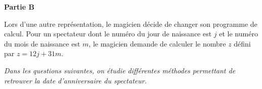 \documentclass[10pt]{article}
\begin{document}
\textbf{Partie B}

\medskip
 
Lors d'une autre représentation, le magicien décide de changer son programme de calcul. Pour un spectateur dont le numéro du jour de naissance est $j$ et le numéro du mois de naissance est $m$, le magicien demande de calculer le nombre $z$ défini par $z = 12j + 31m$.
 
\emph{Dans les questions suivantes, on étudie différentes méthodes permettant de retrouver la date d'anniversaire du spectateur.}

\medskip
 
\end{document}
